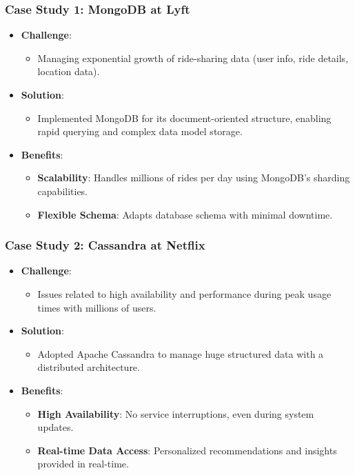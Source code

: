 \documentclass[aspectratio=169]{beamer}
\begin{document}
\begin{frame}[fragile]
  \frametitle{Case Study 1: MongoDB at Lyft}
  \begin{itemize}
    \item \textbf{Challenge}: 
      \begin{itemize}
        \item Managing exponential growth of ride-sharing data (user info, ride details, location data).
      \end{itemize}
    \item \textbf{Solution}: 
      \begin{itemize}
        \item Implemented MongoDB for its document-oriented structure, enabling rapid querying and complex data model storage.
      \end{itemize}
    \item \textbf{Benefits}:
      \begin{itemize}
        \item \textbf{Scalability}: Handles millions of rides per day using MongoDB's sharding capabilities.
        \item \textbf{Flexible Schema}: Adapts database schema with minimal downtime.
      \end{itemize}
  \end{itemize}
\end{frame}

\begin{frame}[fragile]
  \frametitle{Case Study 2: Cassandra at Netflix}
  \begin{itemize}
    \item \textbf{Challenge}: 
      \begin{itemize}
        \item Issues related to high availability and performance during peak usage times with millions of users.
      \end{itemize}
    \item \textbf{Solution}: 
      \begin{itemize}
        \item Adopted Apache Cassandra to manage huge structured data with a distributed architecture.
      \end{itemize}
    \item \textbf{Benefits}:
      \begin{itemize}
        \item \textbf{High Availability}: No service interruptions, even during system updates.
        \item \textbf{Real-time Data Access}: Personalized recommendations and insights provided in real-time.
      \end{itemize}
  \end{itemize}
\end{frame}
\end{document}
